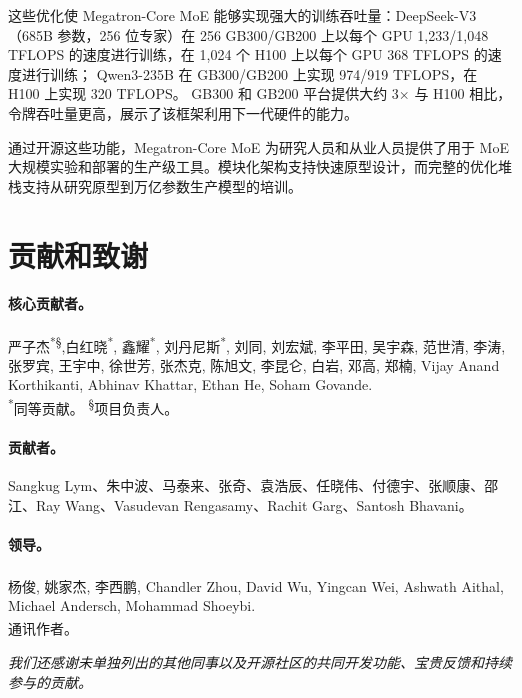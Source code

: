 这些优化使 Megatron-Core MoE 能够实现强大的训练吞吐量：DeepSeek-V3（685B 参数，256 位专家）在 256 GB300/GB200 上以每个 GPU 1,233/1,048 TFLOPS 的速度进行训练，在 1,024 个 H100 上以每个 GPU 368 TFLOPS 的速度进行训练； Qwen3-235B 在 GB300/GB200 上实现 974/919 TFLOPS，在 H100 上实现 320 TFLOPS。 GB300 和 GB200 平台提供大约 3$\times$ 与 H100 相比，令牌吞吐量更高，展示了该框架利用下一代硬件的能力。

通过开源这些功能，Megatron-Core MoE 为研究人员和从业人员提供了用于 MoE 大规模实验和部署的生产级工具。模块化架构支持快速原型设计，而完整的优化堆栈支持从研究原型到万亿参数生产模型的培训。


\section*{贡献和致谢}
\label{sec:contributions}


\paragraph{核心贡献者。}
严子杰\textsuperscript{*\S},白红晓\textsuperscript{*}, 鑫耀\textsuperscript{*}, 刘丹尼斯\textsuperscript{*}, 刘同, 刘宏斌, 李平田, 吴宇森, 范世清, 李涛, 张罗宾, 王宇中, 徐世芳, 张杰克, 陈旭文, 李昆仑, 白岩, 邓高, 郑楠, Vijay Anand Korthikanti, Abhinav Khattar, Ethan He, Soham Govande.\\
{\small \textsuperscript{*}同等贡献。 \textsuperscript{\S}项目负责人。}

\paragraph{贡献者。}
Sangkug Lym、朱中波、马泰来、张奇、袁浩辰、任晓伟、付德宇、张顺康、邵江、Ray Wang、Vasudevan Rengasamy、Rachit Garg、Santosh Bhavani。

\paragraph{领导。}
杨俊\textsuperscript{\dag}, 姚家杰\textsuperscript{\dag}, 李西鹏, Chandler Zhou, David Wu, Yingcan Wei, Ashwath Aithal, Michael Andersch, Mohammad Shoeybi.\\
{\small \textsuperscript{\dag}通讯作者。}

\vspace{0.5em}
\noindent\textit{我们还感谢未单独列出的其他同事以及开源社区的共同开发功能、宝贵反馈和持续参与的贡献。}

